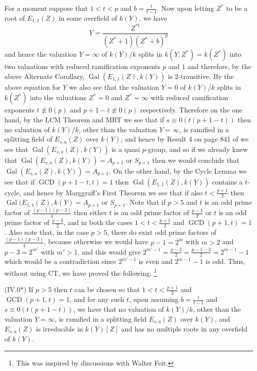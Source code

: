 For a moment suppose that $1<t<p$ and $b=\frac{t}{t-1}$. 
Now upon letting
$Z^*$ to be a root of $E_{1,1}(Z)$ in some overfield of 
$k(Y)$, we have
$$
Y=\frac{Z^{*t}}{(Z^*+1)(Z^*+b)^p}
$$
and hence the valuation $Y=\infty$ of $k(Y)/k$ splits in 
$k(Y,Z^*)=k(Z^*)$
into two valuations with reduced ramification exponents 
$p$ and $1$ and
therefore, by the above Alternate Corollary, 
$\operatorname{Gal}(E_{1,1}(Z),k(Y))$ is
$2$-transitive. By the above equation for $Y$ we also see 
that the valuation
$Y=0$ of $k(Y)/k$ splits in $k(Z^*)$ into the valuations 
$Z^*=0$ and
$Z^*=\infty$ with reduced ramification exponents 
$t\not\equiv 0(p)$ and
$p+1-t\not\equiv 0(p)$ respectively. Therefore on the one 
hand, by
the LCM Theorem and MRT we see that if $s\equiv 0(t(p+1-t))$
then no valuation of $k(Y)/k$, other than the valuation 
$Y=\infty$, is
ramified in a splitting field of $E_{s,a}(Z)$ over $k(Y)$, 
and hence by
Result 4 on page 841 of \cite{A3} we see that 
$\operatorname{Gal}(E_{s,a}(Z),k(Y))$ is
a quasi $p$-group, and so if we already knew that 
$\operatorname{Gal}(E_{s,a}(Z),k(Y))=A_{p+1}$ or $S_{p+1}$ 
then we would conclude that
$\operatorname{Gal}(E_{s,a}(Z),k(Y))=A_{p+1}$. On the 
other hand, by the Cycle Lemma we see 
that if $\operatorname{GCD}(p+1-t,t)=1$ then 
$\operatorname{Gal}(E_{1,1}(Z),k(Y))$ contains a $t$-cycle, 
and hence by Marggraff's First Theorem we see that if also 
$t<\frac{p+1}{2}$ 
then 
$\operatorname{Gal}(E_{1,1}(Z),k(Y)=A_{p+1}$ or $S_{p+1}$.
Note that if $p>5$ and $t$ is an odd prime factor of 
$\frac{(p-1)(p-3)}{4}$
then either $t$ is an odd prime factor of $\frac{p-1}{2}$ 
or $t$ is an odd 
prime factor of $\frac{p-3}{2}$, and in both the cases 
$1<t<\frac{p+1}{2}$
and $\operatorname{GCD}(p+1,t)=1$. Also note that, in the 
case
$p>5$, there do exist odd
prime factors of $\frac{(p-1)(p-3)}{4}$, because otherwise 
we would have
$p-1=2^m$ with $m>2$ and $p-3=2^{m'}$ with $m'>1$, and 
this would give
$2^{m'-1}=\frac{p-3}{2}=\frac{p-1-2}{2}=2^{m-1}-1$ which 
would be a
contradiction since $2^{m'-1}$ is even and $2^{m-1}-1$ is 
odd.
Thus, without using CT, we have proved the following.
\footnote{This was inspired by discussions with Walter 
Feit.}

(IV.0*) If $p>5$ then $t$ can be chosen so that 
$1<t<\frac{p+1}{2}$ 
and$\operatorname{GCD}(p+1,t)=1$, and for any such $t$, 
upon 
assuming $b=\frac{t}{t-1}$
and $s\equiv0(t(p+1-t))$, we have that no valuation of 
$k(Y)/k$, other
than the valuation $Y=\infty$, is ramified in a splitting 
field $E_{s,a}(Z)$
over $k(Y)$, and $E_{s,a}(Z)$ is irreducible in $k(Y)[Z]$ 
and has no
multiple roots in any overfield of $k(Y)$.

